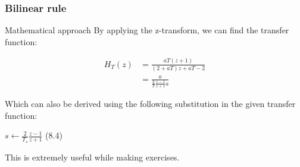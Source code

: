 \begin{frame}
	\frametitle{Bilinear rule}
	\begin{block}{Mathematical approach}
		By applying the z-transform, we can find the transfer function:
		\vspace{-2em}
		\begin{center}
			\begin{align*}
			H_T(z) &= \frac{aT(z+1)}{(2 + aT)z + aT -2}\\
			&= \frac{a}{\frac{2}{T}\frac{z-1}{z+1}a }
			\end{align*}
		\end{center}
		Which can also be derived using the following substitution in the given transfer function:
		\begin{center}
			$s \gets \frac{2}{T_s} \frac{z-1}{z+1}$ (8.4)
		\end{center}
		This is extremely useful while making exercises.
	\end{block}
\end{frame}

